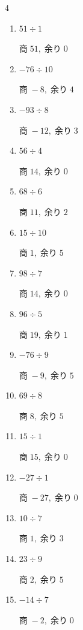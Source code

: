 \begin{multicols}{4}
\begin{enumerate}
  \item $51 \div 1$

        $商\; 51,\; 余り\; 0$

  \item $-76 \div 10$

        $商\; -8,\; 余り\; 4$

  \item $-93 \div 8$

        $商\; -12,\; 余り\; 3$

  \item $56 \div 4$

        $商\; 14,\; 余り\; 0$

  \item $68 \div 6$

        $商\; 11,\; 余り\; 2$

  \item $15 \div 10$

        $商\; 1,\; 余り\; 5$

  \item $98 \div 7$

        $商\; 14,\; 余り\; 0$

\columnbreak %

  \item $96 \div 5$

        $商\; 19,\; 余り\; 1$

  \item $-76 \div 9$

        $商\; -9,\; 余り\; 5$

  \item $69 \div 8$

        $商\; 8,\; 余り\; 5$

  \item $15 \div 1$

        $商\; 15,\; 余り\; 0$

  \item $-27 \div 1$

        $商\; -27,\; 余り\; 0$

  \item $10 \div 7$

        $商\; 1,\; 余り\; 3$

  \item $23 \div 9$

        $商\; 2,\; 余り\; 5$

  \item $-14 \div 7$

        $商\; -2,\; 余り\; 0$


\end{enumerate}
\end{multicols}
